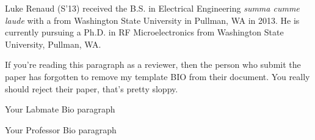 % 
\vspace{-0.5 cm}

\begin{IEEEbiography}{Luke Renaud}
(S’13) received the B.S. in Electrical Engineering \textit{summa cumme laude} with a from Washington State University in Pullman, WA in 2013. He is currently pursuing a Ph.D. in RF Microelectronics from Washington State University, Pullman, WA.

If you're reading this paragraph as a reviewer, then the person who submit the paper has forgotten to remove my template BIO from their document. You really should reject their paper, that's pretty sloppy.
\vspace{-0.8 cm}
\end{IEEEbiography}


\begin{IEEEbiographynophoto}{Your Labmate}
Bio paragraph
\end{IEEEbiographynophoto}

\begin{IEEEbiographynophoto}{Your Professor}
Bio paragraph
\end{IEEEbiographynophoto}

